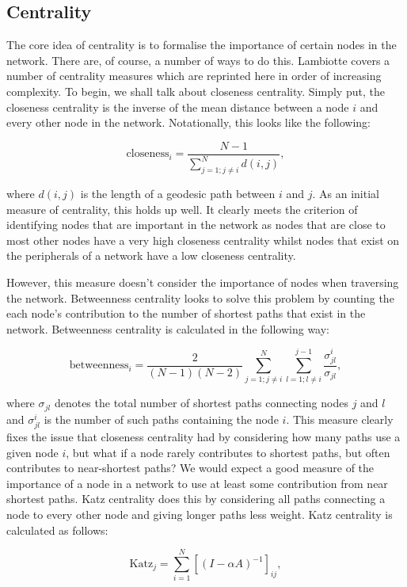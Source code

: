 \subsection{Centrality}
The core idea of centrality is to formalise the importance of certain nodes in the network. There are, of course, a number of ways to do this. Lambiotte covers a number of centrality measures \cite[18]{oxford:renaud_notes} which are reprinted here in order of increasing complexity. To begin, we shall talk about closeness centrality. Simply put, the closeness centrality is the inverse of the mean distance between a node $i$ and every other node in the network. Notationally, this looks like the following:

$$ \text{closeness}_i = \frac{N - 1}{\sum_{j=1; j\not=i}^N d(i, j)}, $$

\noindent
where $d(i, j)$ is the length of a geodesic path between $i$ and $j$. As an initial measure of centrality, this holds up well. It clearly meets the criterion of identifying nodes that are important in the network as nodes that are close to most other nodes have a very high closeness centrality whilst nodes that exist on the peripherals of a network have a low closeness centrality.

However, this measure doesn't consider the importance of nodes when traversing the network. Betweenness centrality looks to solve this problem by counting the each node's contribution to the number of shortest paths that exist in the network. Betweenness centrality is calculated in the following way:

$$ \text{betweenness}_i = \frac{2}{(N-1)(N-2)}\sum_{j=1; j\not=i}^N \sum_{l=1; l\not=i}^{j-1} \frac{\sigma_{jl}^i}{\sigma_{jl}}, $$

\noindent
where $\sigma_{jl}$ denotes the total number of shortest paths connecting nodes $j$ and $l$ and $\sigma^i_{jl}$ is the number of such paths containing the node $i$. This measure clearly fixes the issue that closeness centrality had by considering how many paths use a given node $i$, but what if a node rarely contributes to shortest paths, but often contributes to near-shortest paths? We would expect a good measure of the importance of a node in a network to use at least some contribution from near shortest paths. Katz centrality does this by considering all paths connecting a node to every other node and giving longer paths less weight. Katz centrality is calculated as follows:

$$ \text{Katz}_j = \sum_{i=1}^N[(I - \alpha A)^{-1}]_{ij}, $$

